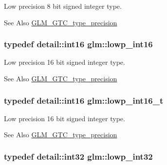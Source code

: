 Low precision 8 bit signed integer type. \begin{DoxySeeAlso}{See Also}
\hyperlink{group__gtc__type__precision}{G\-L\-M\-\_\-\-G\-T\-C\-\_\-type\-\_\-precision} 
\end{DoxySeeAlso}
\hypertarget{group__gtc__type__precision_ga71fc0c399fa4780507748b643733f153}{
\subsubsection[{lowp\-\_\-int16}]{\setlength{\rightskip}{0pt plus 5cm}typedef detail\-::int16 {\bf glm\-::lowp\-\_\-int16}}}\label{group__gtc__type__precision_ga71fc0c399fa4780507748b643733f153}
Low precision 16 bit signed integer type. \begin{DoxySeeAlso}{See Also}
\hyperlink{group__gtc__type__precision}{G\-L\-M\-\_\-\-G\-T\-C\-\_\-type\-\_\-precision} 
\end{DoxySeeAlso}
\hypertarget{group__gtc__type__precision_gae34c3d53c4c1434fc9f26538b0185667}{
\subsubsection[{lowp\-\_\-int16\-\_\-t}]{\setlength{\rightskip}{0pt plus 5cm}typedef detail\-::int16 {\bf glm\-::lowp\-\_\-int16\-\_\-t}}}\label{group__gtc__type__precision_gae34c3d53c4c1434fc9f26538b0185667}
Low precision 16 bit signed integer type. \begin{DoxySeeAlso}{See Also}
\hyperlink{group__gtc__type__precision}{G\-L\-M\-\_\-\-G\-T\-C\-\_\-type\-\_\-precision} 
\end{DoxySeeAlso}
\hypertarget{group__gtc__type__precision_gad9939c9d6fec1c6accc02a83c6500f08}{
\subsubsection[{lowp\-\_\-int32}]{\setlength{\rightskip}{0pt plus 5cm}typedef detail\-::int32 {\bf glm\-::lowp\-\_\-int32}}}\label{group__gtc__type__precision_gad9939c9d6fec1c6accc02a83c6500f08}
